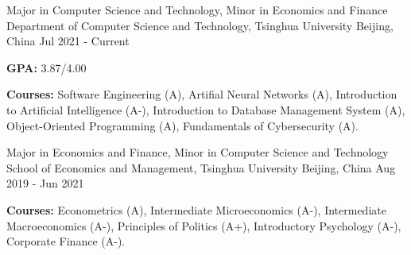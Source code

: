 

\begin{cventries}


  \cventry
    {Major in Computer Science and Technology, Minor in Economics and Finance} %
    {Department of Computer Science and Technology, Tsinghua University} %
    {Beijing, China} %
    {Jul 2021 - Current} %
    {
      \begin{cvitems} %
        \item {\textbf{GPA:}} 3.87/4.00
        \item {\textbf{Courses:} Software Engineering (A), Artifial Neural Networks (A), Introduction to Artificial Intelligence (A-), Introduction to Database Management System (A), Object-Oriented Programming (A), Fundamentals of Cybersecurity (A).}
      \end{cvitems}
    }
    
  \cventry
    {Major in Economics and Finance, Minor in Computer Science and Technology} %
    {School of Economics and Management, Tsinghua University} %
    {Beijing, China} %
    {Aug 2019 - Jun 2021} %
    {
      \begin{cvitems} %
        \item {\textbf{Courses:} Econometrics (A), Intermediate Microeconomics (A-), Intermediate Macroeconomics (A-), Principles of Politics (A+), Introductory Psychology (A-), Corporate Finance (A-).}
      \end{cvitems}
    }

\end{cventries}
